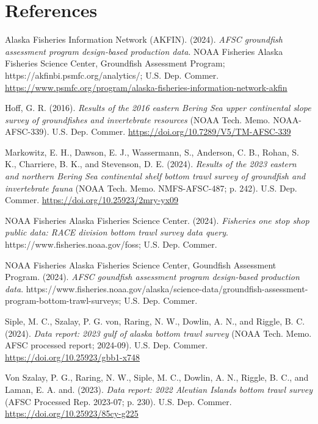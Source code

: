 \documentclass[
  letterpaper,
  oneside,
  open=any]{scrbook}
\newlength{\cslhangindent}
\newenvironment{CSLReferences}[2] %
 {\begin{list}{}{%
  \setlength{\itemindent}{0pt}
  \setlength{\leftmargin}{0pt}
  \setlength{\parsep}{0pt}
  \ifodd #1
   \setlength{\leftmargin}{\cslhangindent}
   \setlength{\itemindent}{-1\cslhangindent}
  \fi
  \setlength{\itemsep}{#2\baselineskip}}}
 {\end{list}}
\begin{document}
\chapter{References}\label{references}

\label{refs}
\begin{CSLReferences}{1}{0}
Alaska Fisheries Information Network (AKFIN). (2024). \emph{AFSC
groundfish assessment program design-based production data}. {NOAA
Fisheries Alaska Fisheries Science Center, Groundfish Assessment
Program}; https://akfinbi.psmfc.org/analytics/; {U.S. Dep. Commer.}
\url{https://www.psmfc.org/program/alaska-fisheries-information-network-akfin}

Hoff, G. R. (2016). \emph{Results of the 2016 eastern {Bering Sea} upper
continental slope survey of groundfishes and invertebrate resources}
(NOAA Tech. Memo. NOAA-AFSC-339). {U.S. Dep. Commer.}
\url{https://doi.org/10.7289/V5/TM-AFSC-339}

Markowitz, E. H., Dawson, E. J., Wassermann, S., Anderson, C. B., Rohan,
S. K., Charriere, B. K., and Stevenson, D. E. (2024). \emph{Results of
the 2023 eastern and northern {Bering Sea} continental shelf bottom
trawl survey of groundfish and invertebrate fauna} (NOAA Tech. Memo.
NMFS-AFSC-487; p. 242). {U.S. Dep. Commer.}
\url{https://doi.org/10.25923/2mry-yx09}

NOAA Fisheries Alaska Fisheries Science Center. (2024). \emph{Fisheries
one stop shop public data: RACE division bottom trawl survey data
query}. https://www.fisheries.noaa.gov/foss; {U.S. Dep. Commer.}

NOAA Fisheries Alaska Fisheries Science Center, Goundfish Assessment
Program. (2024). \emph{AFSC goundfish assessment program design-based
production data}.
https://www.fisheries.noaa.gov/alaska/science-data/groundfish-assessment-program-bottom-trawl-surveys;
{U.S. Dep. Commer.}

Siple, M. C., Szalay, P. G. von, Raring, N. W., Dowlin, A. N., and
Riggle, B. C. (2024). \emph{Data report: 2023 gulf of alaska bottom
trawl survey} (NOAA Tech. Memo. AFSC processed report; 2024-09). {U.S.
Dep. Commer.} \url{https://doi.org/10.25923/gbb1-x748}

Von Szalay, P. G., Raring, N. W., Siple, M. C., Dowlin, A. N., Riggle,
B. C., and Laman, E. A. and. (2023). \emph{Data report: 2022 {Aleutian
Islands} bottom trawl survey} (AFSC Processed Rep. 2023-07; p. 230).
{U.S. Dep. Commer.} \url{https://doi.org/10.25923/85cy-g225}

\end{CSLReferences}


\backmatter
\end{document}

